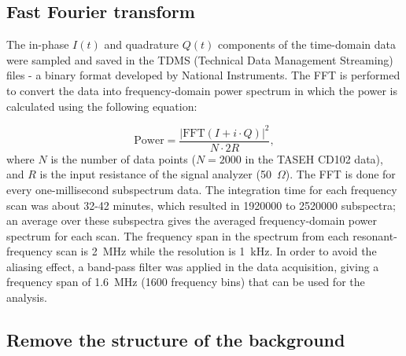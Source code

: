 
\subsection{Fast Fourier transform}
\label{sec:FFT}
The in-phase $I(t)$ and quadrature $Q(t)$ components of the time-domain 
data were sampled and saved in the TDMS 
(Technical Data Management Streaming) files - a 
binary format developed by National Instruments.
The FFT is performed to convert the data into 
frequency-domain power spectrum in which the power is calculated 
using the following equation:

\begin{equation}
\label{eq:4.1}
    \text{Power} = \frac{|\text{FFT}(I+i \cdot Q)|^{2}}{N \cdot 2R},
\end{equation}
where $N$ is the number of data points ($N  = 2000$ in the TASEH 
CD102 data), and $R$ is the input resistance of the signal analyzer 
(50~$\Omega$).
The FFT is done for every one-millisecond subspectrum data. The integration 
time for each frequency scan was about 32-42 minutes, which resulted 
in 1920000 to 2520000 subspectra; an average over these subspectra gives 
the averaged frequency-domain power spectrum for each scan. 
The frequency span in the spectrum from each resonant-frequency scan is 
2~MHz while the resolution is 1~kHz. In order to avoid the aliasing 
effect, a band-pass filter was applied in the data acquisition, 
giving a frequency span of 1.6~MHz (1600 frequency bins) that can be used 
for the analysis. 


\subsection{Remove the structure of the background}

